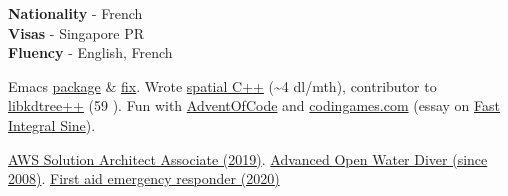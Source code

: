\documentclass[9pt]{developercv} %
\begin{document}

\begin{minipage}[t]{0.3\textwidth}
	\vspace{-\baselineskip} %

	\textbf{Nationality} - French\\
	\textbf{Visas} - Singapore PR\\
	\textbf{Fluency} - English, French\\

\end{minipage}
\hfill
\begin{minipage}[t]{0.3\textwidth}
	\vspace{-\baselineskip} %
	
	
	Emacs \href{https://github.com/sbougerel/autosync-magit}{package} \& \href{https://lists.gnu.org/archive/html/bug-gnu-emacs/2023-11/msg00532.html}{fix}. Wrote \href{https://github.com/sbougerel/spatial}{spatial C++} (\textasciitilde{}4 dl/mth), contributor to \href{https://github.com/nvmd/libkdtree}{libkdtree++} (59 \faStarO). Fun with \href{https://github.com/sbougerel/adventofcode2023}{AdventOfCode} and \href{https://www.codingame.com/start/}{codingames.com} (essay on \href{https://medium.com/@sylvainbougerel/fast-integral-sine-curve-fitting-range-reduction-and-a-little-on-assembly-10b63e82f554}{Fast Integral Sine}).
\end{minipage}
\hfill
\begin{minipage}[t]{0.3\textwidth}
	\vspace{-\baselineskip} %
	

	\href{https://www.credly.com/badges/287f94f4-3c65-4765-b58e-91ea5781a06f}{AWS Solution Architect Associate (2019)}. \href{https://gs-diving.com/padi-courses/advanced-open-water/}{Advanced Open Water Diver (since 2008)}. \href{https://sera.sg/e/cert-first-aid/}{First aid emergency responder (2020)}
\end{minipage}

\end{document}
